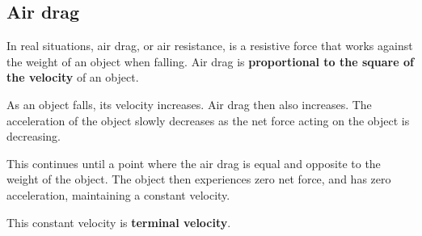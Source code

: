 \documentclass[../main.tex]{subfiles}
\begin{document}
		\subsection{Air drag}
		In real situations, air drag, or air resistance, is a resistive force that works against the weight of an object when falling. Air drag is \textbf{proportional to the square of the velocity} of an object.
		
		As an object falls, its velocity increases. Air drag then also increases. The acceleration of the object slowly decreases as the net force acting on the object is decreasing. 
		
		This continues until a point where the air drag is equal and opposite to the weight of the object. The object then experiences zero net force, and has zero acceleration, maintaining a constant velocity. 
		
		This constant velocity is \textbf{terminal velocity}.
		\begin{center}
		\end{center}
		\begin{center}
		\end{center}
		
\end{document}
